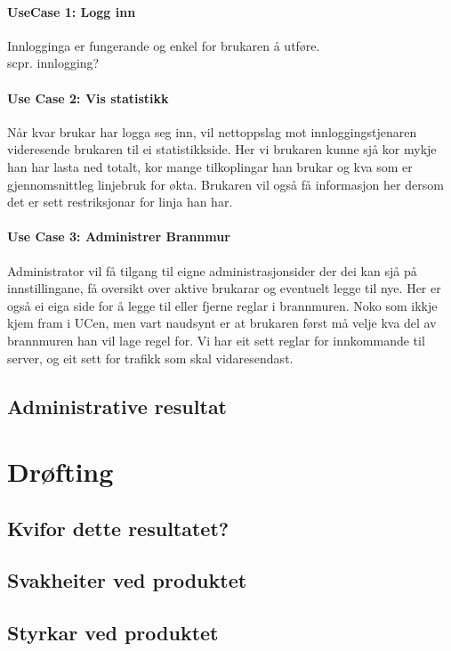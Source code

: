 \documentclass[nynorsk,12pt,a4paper,oneside]{book}
\begin{document}
\subsubsection{UseCase 1: Logg inn}
Innlogginga er fungerande og enkel for brukaren å utføre. \\
scpr. innlogging?

\subsubsection{Use Case 2: Vis statistikk}
Når kvar brukar har logga seg inn, vil nettoppslag mot innloggingstjenaren videresende brukaren til ei statistikkside. Her vi brukaren kunne sjå kor mykje han har lasta ned totalt, kor mange tilkoplingar han brukar og kva som er gjennomsnittleg linjebruk for økta. Brukaren vil også få informasjon her dersom det er sett restriksjonar for linja han har.

\subsubsection{Use Case 3: Administrer Brannmur}
Administrator vil få tilgang til eigne administrasjonsider der dei kan sjå på innstillingane, få oversikt over aktive brukarar og eventuelt legge til nye. Her er også ei eiga side for å legge til eller fjerne reglar i brannmuren. Noko som ikkje kjem fram i UCen, men vart naudsynt er at brukaren først må velje kva del av brannmuren han vil lage regel for. Vi har eit sett reglar for innkommande til server, og eit sett for trafikk som skal vidaresendast.

\section{Administrative resultat}


\chapter{Drøfting}
\section{Kvifor dette resultatet?}
\section{Svakheiter ved produktet}
\section{Styrkar ved produktet}
\end{document}
